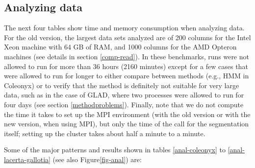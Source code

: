 \documentclass[a4paper,11pt]{article}
\begin{document}
\clearpage
\subsection{Analyzing data}\label{comp-anal}
The next four tables show time and memory consumption when analyzing
data. For the old version, the largest data sets analyzed are of 200
columns for the Intel Xeon machine with 64 GB of RAM, and 1000 columns for
the AMD Opteron machines (see details in section \ref{comp-read}). In
these benchmarks, runs were not allowed to run for more than 36 hours
(2160 minutes) except for a few cases that were allowed to run for longer
to either compare between methods (e.g., HMM in Coleonyx) or to verify
that the method is definitely not suitable for very large data, such as in
the case of GLAD, where two processes were allowed to run for four days
(see section \ref{methodproblems}). Finally, note that we do not compute
the time it takes to set up the MPI environment (with the old version or
with the new version, when using MPI), but only the time of the call for
the segmentation itself; setting up the cluster takes about half a minute
to a minute.


Some of the major patterns and results shown in tables \ref{anal-coleonyx}
to \ref{anal-lacerta-gallotia} (see also Figure\ref{fig-anal}) are:
\end{document}
